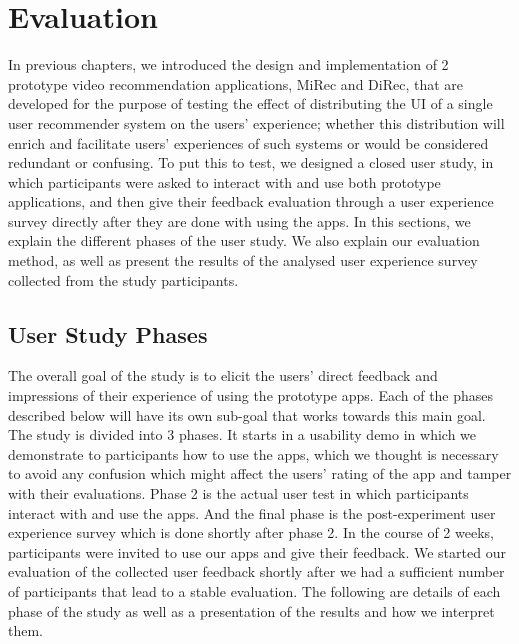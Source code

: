 \chapter{Evaluation}\label{chapter:eval}
In previous chapters, we introduced the design and implementation of 2 prototype
video recommendation applications, MiRec and DiRec, that are developed for the
purpose of testing the effect of distributing the UI of a single user recommender system on the users'
experience; whether this distribution will enrich and facilitate users'
experiences of such systems or would be considered redundant or confusing. To
put this to test, we designed a closed user study, in which participants were
asked to interact with and use both prototype applications, and then give their
feedback evaluation through a user experience survey directly after they are done with
using the apps. In this sections, we explain the different phases of the user
study. We also explain our evaluation method, as well as present the results of
the analysed user experience survey collected from the study participants.

\section{User Study Phases}
The overall goal of the study is to elicit the users’ direct
feedback and impressions of their experience of using the prototype apps.
Each of the phases described below will have its own sub-goal that works
towards this main goal. The study is divided into 3 phases. It starts in a
usability demo in which we demonstrate to participants how to use the apps,
which we thought is necessary to avoid any confusion which might affect the
users' rating of the app and tamper with their evaluations. Phase 2 is the
actual user test in which participants interact with and use the apps. And the
final phase is the post-experiment user experience survey which is done shortly after phase
2. In the course of 2 weeks, participants were invited to use our apps and give
their feedback. We started our evaluation of the collected user feedback shortly
after we had a sufficient number of participants that lead to a stable
evaluation.
The following are details of each phase of the study as well as a presentation
of the results and how we interpret them.
